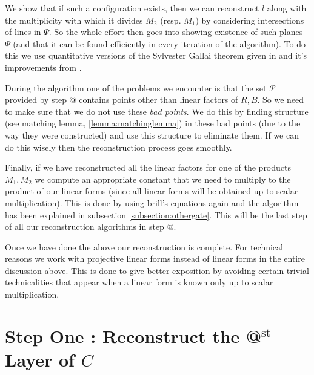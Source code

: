 \documentclass[12pt]{caltech_thesis}
\makeatletter
\theoremstyle{plain}
\theoremstyle{definition}
\newcommand{\MP}{\mathcal{P}}
\newcommand*{\rom}[1]{\expandafter\@slowromancap\romannumeral #1@}
\makeatother
\begin{document}
We show that if such a configuration exists, then we can reconstruct $l$ along with the multiplicity with which it 
divides $M_2$ (resp. $M_1$) by considering intersections of lines in $\Psi$.
So the whole effort then goes into showing existence of such planes $\Psi$ (and that it can be found efficiently in every iteration
of the algorithm). To do this we use quantitative versions of the Sylvester Gallai theorem given in \cite{BDWY11} and it's improvements 
from \cite{DSW12}. 

During the algorithm one of the problems we encounter is that the set $\MP$ provided by step \rom{1} contains points other than 
linear factors of $R,B$. So we need to make sure that we do not use these \emph{bad points}. We do this by finding structure (see matching lemma, 
\ref{lemma:matchinglemma}) 
in these bad points (due to the way they were
constructed) and use this structure to eliminate them. If we can do this wisely then the reconstruction process goes smoothly. 

Finally, if we have reconstructed all the linear factors for one of the products $M_1,M_2$ we compute an appropriate constant that we need to
multiply to the product of our linear forms (since all linear forms will be obtained up to scalar multiplication). This is done by
using brill's equations again and the algorithm has been explained in subsection \ref{subsection:othergate}. This will be the last step of
all our reconstruction algorithms in step \rom{2}.

Once we have done the above our reconstruction is complete. For technical reasons we work with projective linear forms instead
of linear forms in the entire discussion above. This is done to give better exposition by avoiding certain trivial
technicalities that appear when a linear form is
known only up to scalar multiplication.










\chapter{Step One : Reconstruct the \rom{1}$^{\text{st}}$ Layer of $C$ }\label{section:stepone}
\end{document}
